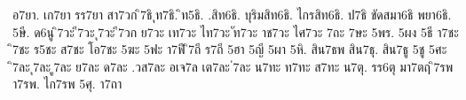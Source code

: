 {อ7ยา.
เก7ยา
รร7ยา
สา7วก
ิ7ธิ
ุท7ธิ.
ิท5ธิ.
.สิท6ธิ.
บุริมสิท6ธิ.
ไกรสิท6ธิ.
ป7ธิ
ขัดสมา6ธิ
พยา6ธิ.
5ษี.
ด6นู
ิ7วะ
ี7วะ
ุ7วะ
ี7วก
ย7วะ
เท7วะ
ไท7วะ
ัท7วะ
าช7วะ
ไศ7วะ
7ถะ
7ษะ
5พร.
5ผง
5ธี
า7ชะ
ิ7ชะ
ร5ชะ
ส7ชะ
โอ7ชะ
5ฆะ
5ฟะ
า7ฟี
ิ7ถี
ร7ถี
5ฮา
5ญี
5ผา
5หิ.
สิน7ธพ
สิน7ธุ.
สิน7ธู
5ชู
5ศะ
ิ7ละ
ุ7ละ
ู7ละ
ย7ละ
ด7ละ
.วส7ละ
อเจ7ล
เต7ละ
่7ละ
น7ทะ
ท7ทะ
ส7ทะ
น7ตุ.
รร6ตุ
มา7ตฤ
ิ7รพ
า7รพ.
ไก7รพ
5ศุ.
า7ถา
}
